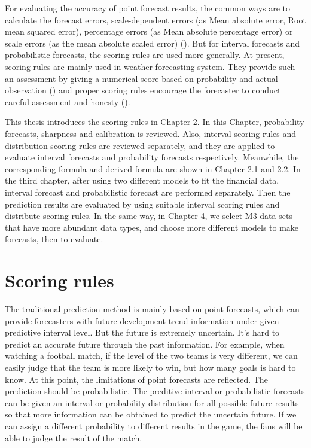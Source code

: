 \documentclass{monashthesis}
\theoremstyle{definition}
\theoremstyle{definition}
\theoremstyle{definition}
\theoremstyle{remark}
\begin{document}
For evaluating the accuracy of point forecast results, the common ways
are to calculate the forecast errors, scale-dependent errors (as Mean
absolute error, Root mean squared error), percentage errors (as Mean
absolute percentage error) or scale errors (as the mean absolute scaled
error) (\textcite{RA18}). But for interval forecasts and probabilistic
forecasts, the scoring rules are used more generally. At present,
scoring rules are mainly used in weather forecasting system. They
provide such an assessment by giving a numerical score based on
probability and actual observation (\textcite{W96}) and proper scoring
rules encourage the forecaster to conduct careful assessment and honesty
(\textcite{GR07}).

This thesis introduces the scoring rules in Chapter 2. In this Chapter,
probability forecasts, sharpness and calibration is reviewed. Also,
interval scoring rules and distribution scoring rules are reviewed
separately, and they are applied to evaluate interval forecasts and
probability forecasts respectively. Meanwhile, the corresponding formula
and derived formula are shown in Chapter 2.1 and 2.2. In the third
chapter, after using two different models to fit the financial data,
interval forecast and probabilistic forecast are performed separately.
Then the prediction results are evaluated by using suitable interval
scoring rules and distribute scoring rules. In the same way, in Chapter
4, we select M3 data sets that have more abundant data types, and choose
more different models to make forecasts, then to evaluate.

\chapter{Scoring rules}\label{scoring-rules}

The traditional prediction method is mainly based on point forecasts,
which can provide forecasters with future development trend information
under given predictive interval level. But the future is extremely
uncertain. It's hard to predict an accurate future through the past
information. For example, when watching a football match, if the level
of the two teams is very different, we can easily judge that the team is
more likely to win, but how many goals is hard to know. At this point,
the limitations of point forecasts are reflected. The prediction should
be probabilistic. The preditive interval or probabilistic forecasts can
be given an interval or probability distribution for all possible future
results so that more information can be obtained to predict the
uncertain future. If we can assign a different probability to different
results in the game, the fans will be able to judge the result of the
match.
\end{document}
